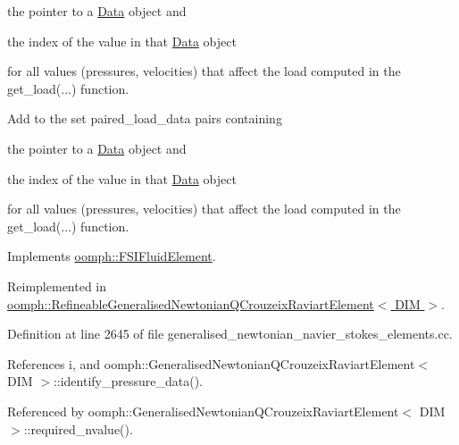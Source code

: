 \begin{DoxyItemize}
\item the pointer to a \hyperlink{classoomph_1_1Data}{Data} object and
\item the index of the value in that \hyperlink{classoomph_1_1Data}{Data} object
\end{DoxyItemize}for all values (pressures, velocities) that affect the load computed in the {\ttfamily get\+\_\+load}(...) function.

Add to the set {\ttfamily paired\+\_\+load\+\_\+data} pairs containing
\begin{DoxyItemize}
\item the pointer to a \hyperlink{classoomph_1_1Data}{Data} object and
\item the index of the value in that \hyperlink{classoomph_1_1Data}{Data} object
\end{DoxyItemize}for all values (pressures, velocities) that affect the load computed in the {\ttfamily get\+\_\+load}(...) function. 

Implements \hyperlink{classoomph_1_1FSIFluidElement_a13c5f835cddd1b78e6d2582733619300}{oomph\+::\+F\+S\+I\+Fluid\+Element}.



Reimplemented in \hyperlink{classoomph_1_1RefineableGeneralisedNewtonianQCrouzeixRaviartElement_a14c12617fd3fe6ea248c2ec54993b0a5}{oomph\+::\+Refineable\+Generalised\+Newtonian\+Q\+Crouzeix\+Raviart\+Element$<$ D\+I\+M $>$}.



Definition at line 2645 of file generalised\+\_\+newtonian\+\_\+navier\+\_\+stokes\+\_\+elements.\+cc.



References i, and oomph\+::\+Generalised\+Newtonian\+Q\+Crouzeix\+Raviart\+Element$<$ D\+I\+M $>$\+::identify\+\_\+pressure\+\_\+data().



Referenced by oomph\+::\+Generalised\+Newtonian\+Q\+Crouzeix\+Raviart\+Element$<$ D\+I\+M $>$\+::required\+\_\+nvalue().

\mbox{\label{classoomph_1_1GeneralisedNewtonianQCrouzeixRaviartElement_aa27ed653fcc13e9f615d0f120ccb09c6}} 
